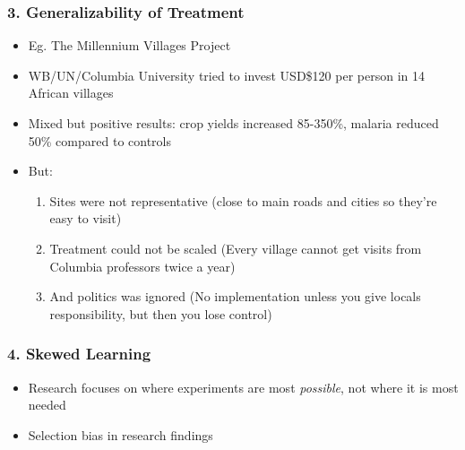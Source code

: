 \documentclass[xcolor=x11names,compress]{beamer}\usepackage[]{graphicx}\usepackage[]{color}
\renewcommand{\(}{\begin{columns}}
\renewcommand{\)}{\end{columns}}
\newcommand{\<}[1]{\begin{column}{#1}}
\renewcommand{\>}{\end{column}}
\begin{document}
\begin{frame}
\frametitle{3. Generalizability of Treatment}
\begin{itemize}
\item Eg. The Millennium Villages Project
\pause
\item WB/UN/Columbia University tried to invest USD\$120 per person in 14 African villages
\pause
\item Mixed but positive results: crop yields increased 85-350\%, malaria reduced 50\% compared to controls
\pause
\item But:
\begin{enumerate}
\item Sites were not representative (close to main roads and cities so they're easy to visit)
\pause
\item Treatment could not be scaled (Every village cannot get visits from Columbia professors twice a year)
\pause
\item And politics was ignored (No implementation unless you give locals responsibility, but then you lose control)
\end{enumerate}
\end{itemize}
\end{frame}

\begin{frame}
\frametitle{4. Skewed Learning}
\begin{itemize}
\item Research focuses on where experiments are most \textit{possible}, not where it is most needed
\pause
\item Selection bias in research findings
\end{itemize}
\end{frame}
\end{document}
